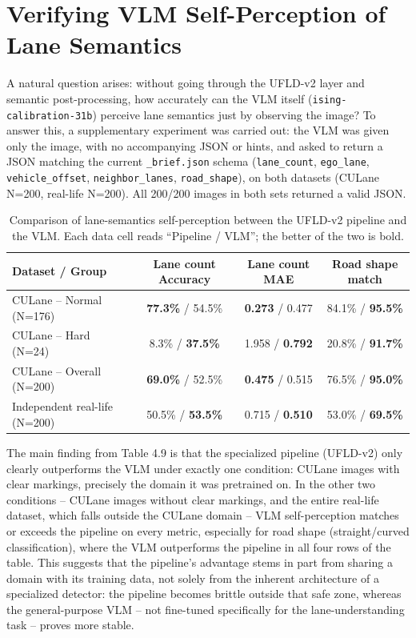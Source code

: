 \documentclass[12pt,a4paper]{report}
\begin{document}
\section{Verifying VLM Self-Perception of Lane Semantics}

A natural question arises: without going through the UFLD-v2 layer and semantic post-processing, how accurately can the VLM itself (\texttt{ising-calibration-31b}) perceive lane semantics just by observing the image? To answer this, a supplementary experiment was carried out: the VLM was given only the image, with no accompanying JSON or hints, and asked to return a JSON matching the current \texttt{\_brief.json} schema (\texttt{lane\_count}, \texttt{ego\_lane}, \texttt{vehicle\_offset}, \texttt{neighbor\_lanes}, \texttt{road\_shape}), on both datasets (CULane N=200, real-life N=200). All 200/200 images in both sets returned a valid JSON.

\begin{table}[htbp]
    \centering
    \small
    \caption{Comparison of lane-semantics self-perception between the UFLD-v2 pipeline and the VLM. Each data cell reads ``Pipeline / VLM''; the better of the two is bold.}
    \label{tab:4.9}
    \begin{tabular}{@{}p{3.6cm}ccc@{}}
        \toprule
        \textbf{Dataset / Group} & \textbf{Lane count Accuracy} & \textbf{Lane count MAE} & \textbf{Road shape match} \\
        \midrule
        CULane -- Normal (N=176)      & \textbf{77.3\%} / 54.5\%          & \textbf{0.273} / 0.477          & 84.1\% / \textbf{95.5\%} \\
        CULane -- Hard (N=24)         & 8.3\% / \textbf{37.5\%}           & 1.958 / \textbf{0.792}          & 20.8\% / \textbf{91.7\%} \\
        CULane -- Overall (N=200)     & \textbf{69.0\%} / 52.5\%          & \textbf{0.475} / 0.515          & 76.5\% / \textbf{95.0\%} \\
        Independent real-life (N=200) & 50.5\% / \textbf{53.5\%}          & 0.715 / \textbf{0.510}          & 53.0\% / \textbf{69.5\%} \\
        \bottomrule
    \end{tabular}
\end{table}

The main finding from Table 4.9 is that the specialized pipeline (UFLD-v2) only clearly outperforms the VLM under exactly one condition: CULane images with clear markings, precisely the domain it was pretrained on. In the other two conditions -- CULane images without clear markings, and the entire real-life dataset, which falls outside the CULane domain -- VLM self-perception matches or exceeds the pipeline on every metric, especially for road shape (straight/curved classification), where the VLM outperforms the pipeline in all four rows of the table. This suggests that the pipeline's advantage stems in part from sharing a domain with its training data, not solely from the inherent architecture of a specialized detector: the pipeline becomes brittle outside that safe zone, whereas the general-purpose VLM -- not fine-tuned specifically for the lane-understanding task -- proves more stable.
\end{document}
